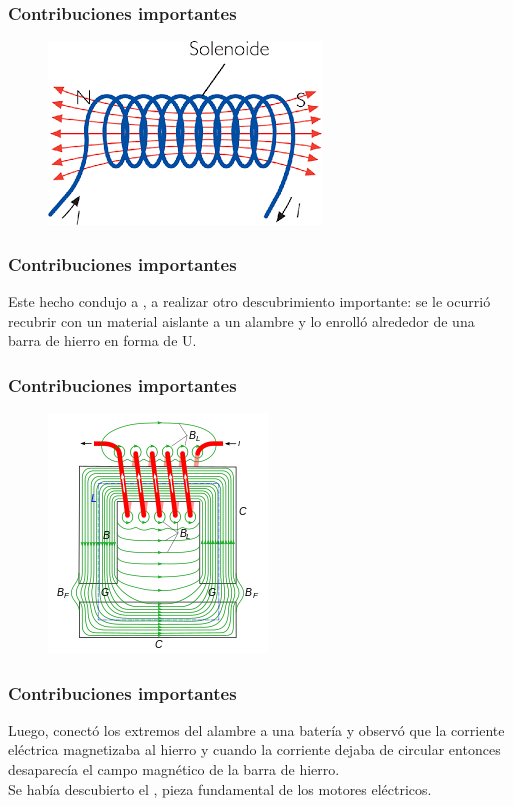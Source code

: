 \documentclass[14pt]{beamer}
\begin{document}
\begin{frame}
\frametitle{Contribuciones importantes}    
\begin{figure}
    \centering
    \includegraphics[scale=0.7]{Imagenes/Electromagnetismo_02.jpg}
\end{figure}
\end{frame}
\begin{frame}
\frametitle{Contribuciones importantes}
Este hecho condujo a , a realizar otro descubrimiento importante: \pause se le ocurrió recubrir con un material aislante a un alambre y lo enrolló alrededor de una barra de hierro en forma de U.
\end{frame}
\begin{frame}
\frametitle{Contribuciones importantes}    
\begin{figure}
    \centering
    \includegraphics[scale=0.8]{Imagenes/Electromagnetismo_03.png}
\end{figure}
\end{frame}
\begin{frame}
\frametitle{Contribuciones importantes}
Luego, conectó los extremos del alambre a una batería y observó que la corriente eléctrica magnetizaba al hierro y cuando la corriente dejaba de circular entonces desaparecía el campo magnético de la barra de hierro.
\\
\bigskip
\pause
Se había descubierto el , pieza fundamental de los motores eléctricos.
\end{frame}
\end{document}
